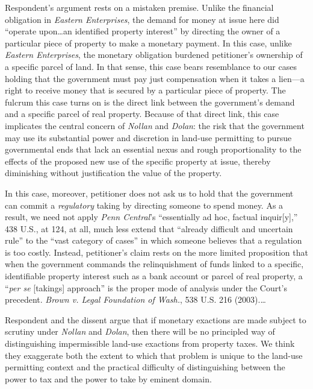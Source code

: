 Respondent's argument rests on a mistaken premise. Unlike the financial
obligation in \textit{Eastern Enterprises}, the demand for money at issue here
did ``operate upon\ldots an identified property interest'' by directing the
owner of a particular piece of property to make a monetary payment. In this
case, unlike \textit{Eastern Enterprises}, the monetary obligation burdened
petitioner's ownership of a specific parcel of land. In that sense, this case
bears resemblance to our cases holding that the government must pay just
compensation when it takes a lien---a right to receive money that is secured by
a particular piece of property. The fulcrum this case turns on is the direct
link between the government's demand and a specific parcel of real property.
Because of that direct link, this case implicates the central concern of
\textit{Nollan} and \textit{Dolan}: the risk that the government may use its
substantial power and discretion in land-use permitting to pursue governmental
ends that lack an essential nexus and rough proportionality to the effects of
the proposed new use of the specific property at issue, thereby diminishing
without justification the value of the property.

In this case, moreover, petitioner does not ask us to hold that the government
can commit a \textit{regulatory} taking by directing someone to spend money. As
a result, we need not apply \textit{Penn Central}'s ``essentially ad hoc,
factual inquir[y],'' 438 U.S., at 124, at all, much less extend that ``already
difficult and uncertain rule'' to the ``vast category of cases'' in which
someone believes that a regulation is too costly. Instead, petitioner's claim
rests on the more limited proposition that when the government commands the
relinquishment of funds linked to a specific, identifiable property interest
such as a bank account or parcel of real property, a ``\textit{per se} [takings]
approach'' is the proper mode of analysis under the Court's precedent.
\textit{Brown v. Legal Foundation of Wash.}, 538 U.S. 216 (2003).\ldots 



Respondent and the dissent argue that if monetary exactions are made subject to
scrutiny under \textit{Nollan} and \textit{Dolan}, then there will be no
principled way of distinguishing impermissible land-use exactions from property
taxes. We think they exaggerate both the extent to which that problem is unique
to the land-use permitting context and the practical difficulty of
distinguishing between the power to tax and the power to take by eminent domain.


